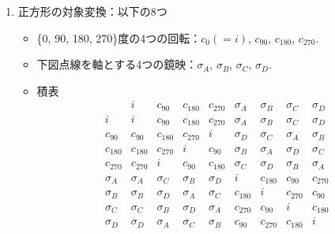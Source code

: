 \documentclass[11pt,a4paper]{jsarticle}
\begin{document}
\begin{enumerate}
 \item 正方形の対象変換：以下の8つ
       \begin{itemize} 
	\item \{0, 90, 180, 270\}度の4つの回転：$c_{0}(=i)$, $c_{90}$, $c_{180}$, $c_{270}$.
	\item 下図点線を軸とする4つの鏡映：$\sigma_A$, $\sigma_B$, $\sigma_C$, $\sigma_D$.
\begin{center}
\end{center}

	\item 積表
\[
\begin{array}{c|cccccccc}
             & i & c_{90} & c_{180} & c_{270} & \sigma_A & \sigma_B & \sigma_C & \sigma_D \\ \hline
       i & i & c_{90} & c_{180} & c_{270} & \sigma_A & \sigma_B & \sigma_C & \sigma_D \\ 
       c_{90} & c_{90} & c_{180} & c_{270} & i & \sigma_D & \sigma_C & \sigma_A & \sigma_B \\ 
       c_{180} & c_{180} & c_{270} & i & c_{90} & \sigma_B & \sigma_A & \sigma_D & \sigma_C \\ 
       c_{270} & c_{270} & i & c_{90} & c_{180} & \sigma_C & \sigma_D & \sigma_B & \sigma_A \\ 
       \sigma_A & \sigma_A & \sigma_C & \sigma_B & \sigma_D & i     & c_{180} & c_{90} & c_{270}\\ 
       \sigma_B & \sigma_B & \sigma_D & \sigma_A & \sigma_C & c_{180} &  i    & c_{270} & c_{90} \\ 
       \sigma_C & \sigma_C & \sigma_B & \sigma_D & \sigma_A & c_{270} & c_{90} & i     & c_{180}\\ 
       \sigma_D & \sigma_D & \sigma_A & \sigma_C & \sigma_B & c_{90} & c_{270} & c_{180} & i \\      
\end{array}
\]
       \end{itemize} 


\end{enumerate}
\end{document}
